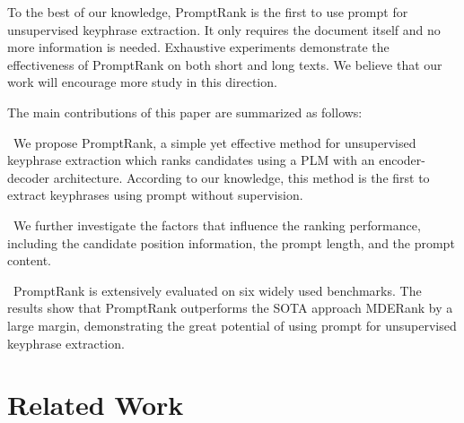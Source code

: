 \documentclass[11pt]{article}
\begin{document}
To the best of our knowledge, PromptRank is the first to use prompt for unsupervised keyphrase extraction. It only requires the document itself and no more information is needed. Exhaustive experiments demonstrate the effectiveness of PromptRank on both short and long texts. We believe that our work will encourage more study in this direction.

The main contributions of this paper are summarized as follows:

\textbullet\ We propose PromptRank, a simple yet effective method for unsupervised keyphrase extraction which ranks candidates using a PLM with an encoder-decoder architecture. According to our knowledge, this method is the first to extract keyphrases using prompt without supervision.

\textbullet\ We further investigate the factors that influence the ranking performance, including the candidate position information, the prompt length, and the prompt content.

\textbullet\ PromptRank is extensively evaluated on six widely used benchmarks. The results show that PromptRank outperforms the SOTA approach MDERank by a large margin, demonstrating the great potential of using prompt for unsupervised keyphrase extraction.





\section{Related Work}
\end{document}
